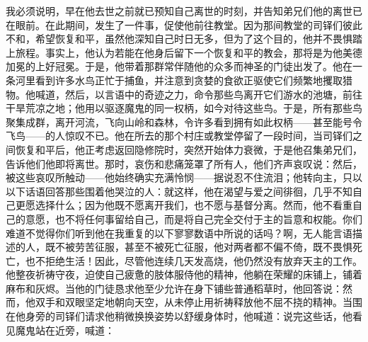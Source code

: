 我必须说明，早在他去世之前就已预知自己离世的时刻，并告知弟兄们他的离世已在眼前。在此期间，发生了一件事，促使他前往教堂。因为那间教堂的司铎们彼此不和，希望恢复和平，虽然他深知自己时日无多，但为了这个目的，他并不畏惧踏上旅程。事实上，他认为若能在他身后留下一个恢复和平的教会，那将是为他美德加冕的上好冠冕。于是，他带着那群常伴随他的众多而神圣的门徒出发了。他在一条河里看到许多水鸟正忙于捕鱼，并注意到贪婪的食欲正驱使它们频繁地攫取猎物。他喊道，然后，以言语中的奇迹之力，命令那些鸟离开它们游水的池塘，前往干旱荒凉之地；他用以驱逐魔鬼的同一权柄，如今对待这些鸟。于是，所有那些鸟聚集成群，离开河流，飞向山岭和森林，令许多看到拥有如此权柄——甚至能号令飞鸟——的人惊叹不已。他在所去的那个村庄或教堂停留了一段时间，当司铎们之间恢复和平后，他正考虑返回隐修院时，突然开始体力衰微，于是他召集弟兄们，告诉他们他即将离世。那时，哀伤和悲痛笼罩了所有人，他们齐声哀叹说：然后，被这些哀叹所触动——他始终确实充满怜悯——据说忍不住流泪；他转向主，只以以下话语回答那些围着他哭泣的人：就这样，他在渴望与爱之间徘徊，几乎不知自己更愿选择什么；因为他既不愿离开我们，也不愿与基督分离。然而，他不看重自己的意愿，也不将任何事留给自己，而是将自己完全交付于主的旨意和权能。你们难道不觉得你们听到他在我重复的以下寥寥数语中所说的话吗？啊，无人能言语描述的人，既不被劳苦征服，甚至不被死亡征服，他对两者都不偏不倚，既不畏惧死亡，也不拒绝生活！因此，尽管他连续几天发高烧，他仍然没有放弃天主的工作。他整夜祈祷守夜，迫使自己疲惫的肢体服侍他的精神，他躺在荣耀的床铺上，铺着麻布和灰烬。当他的门徒恳求他至少允许在身下铺些普通稻草时，他回答说：然而，他双手和双眼坚定地朝向天空，从未停止用祈祷释放他不屈不挠的精神。当围在他身旁的司铎们请求他稍微换换姿势以舒缓身体时，他喊道：说完这些话，他看见魔鬼站在近旁，喊道：\par

